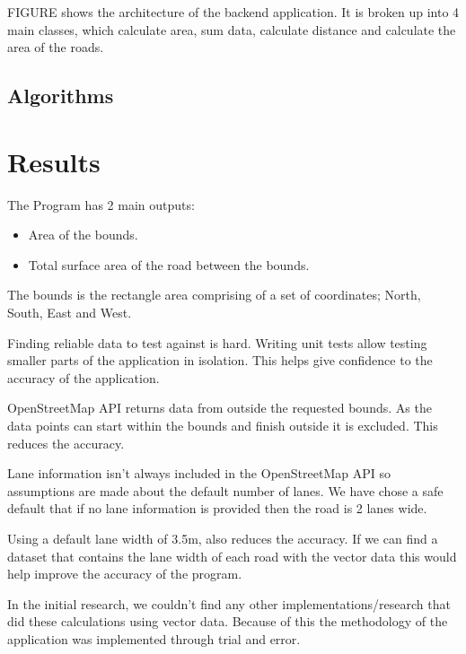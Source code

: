 \documentclass[a4paper,11pt]{article}
\begin{document}
FIGURE shows the architecture of the backend application. It is broken up into 4
main classes, which calculate area, sum data, calculate distance and calculate
the area of the roads.


\subsection{Algorithms}


\section{Results}


The Program has 2 main outputs:

\begin{itemize}
  \item Area of the bounds.
  \item Total surface area of the road between the bounds.
\end{itemize}

The bounds is the rectangle area comprising of a set of coordinates; North,
South, East and West.

Finding reliable data to test against is hard. Writing unit tests allow testing
smaller parts of the application in isolation. This helps give confidence to the
accuracy of the application.

OpenStreetMap API returns data from outside the requested bounds. As the data
points can start within the bounds and finish outside it is excluded. This
reduces the accuracy.

Lane information isn't always included in the OpenStreetMap API so assumptions
are made about the default number of lanes. We have chose a safe default that if
no lane information is provided then the road is 2 lanes wide.

Using a default lane width of 3.5m, also reduces the accuracy. If we can find a
dataset that contains the lane width of each road with the vector data this
would help improve the accuracy of the program.

In the initial research, we couldn't find any other implementations/research
that did these calculations using vector data. Because of this the methodology
of the application was implemented through trial and error.
\end{document}
